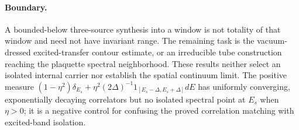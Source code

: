 \paragraph{Boundary.}
A bounded-below three-source synthesis into a window is not totality of
that window and need not have invariant range. The remaining task is the
vacuum-dressed excited-transfer contour estimate, or an irreducible tube
construction reaching the plaquette spectral neighborhood. These results
neither select an isolated internal carrier nor establish the spatial
continuum limit. The positive measure
$(1-\eta^2)\delta_{E_s}+\eta^2(2\Delta)^{-1}1_{[E_s-\Delta,E_s+\Delta]}dE$
has uniformly converging, exponentially decaying correlators but no
isolated spectral point at $E_s$ when $\eta>0$; it is a negative control
for confusing the proved correlation matching with excited-band isolation.
